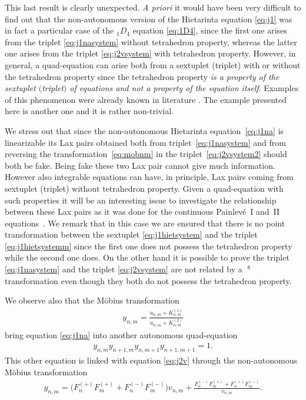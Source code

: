 \documentclass[pdftex]{sigma}
\numberwithin{equation}{section}
\DeclareMathOperator{\Mob}{M\ddot{o}b}
\newcommand{\Fp}[1]{F^{(+)}_{#1}}
\newcommand{\Fm}[1]{F^{(-)}_{#1}}
\newcommand{\Fppp}{\Fp{n}\Fp{m}}
\newcommand{\Fpmm}{\Fp{n}\Fm{m}}
\newcommand{\Fmpm}{\Fm{n}\Fp{m}}
\newcommand{\Fmmp}{\Fm{n}\Fm{m}}
\begin{document}
This last result is clearly unexpected. \emph{A priori} it would have been very dif\/f\/icult to f\/ind out that the non-autonomous
version of the Hietarinta equation \eqref{eq:j1} was in fact a particular
case of the $_{1}D_{4}$ equation \eqref{eq:1D4},
since the f\/irst one arises from the triplet \eqref{eq:j1nasystem}
without tetrahedron property,
whereas the latter one arises from the triplet \eqref{eq:j2vsystem}
with tetrahedron property.
However, in general, a quad-equation can arise both from a sextuplet (triplet) with
or without the tetrahedron property since the tetrahedron property
\emph{is a property of the sextuplet $($triplet$)$ of equations and not a property
of the equation itself}.
Examples of this phenomenon were already known in literature
\cite{ABS2009,Atkinson2008, HietarintaViallet2012}.
The example presented here is another one and it is rather non-trivial.

We stress out that since the non-autonomous Hietarinta equation~\eqref{eq:j1na}
is linearizable its Lax pairs obtained both
from triplet~\eqref{eq:j1nasystem} and from
reversing the transformation~\eqref{eq:mobnm} in the triplet~\eqref{eq:j2vsystem2} should both be fake.
Being fake these two Lax pair cannot give much information.
However also integrable equations can have, in principle,
Lax pairs coming from sextuplet (triplet) without tetrahedron property.
Given a quad-equation with such properties
it will be an interesting issue to investigate
the relationship between these Lax pairs as it was
done for the continuous Painlev\'e~I and~II equations~\cite{Joshietal2009}.
We remark that in this case we are ensured that there
is no point transformation between the sextuplet \eqref{eq:j1hietsystem}
and the triplet \eqref{eq:j1hietsystemm} since the f\/irst one does
not possess the tetrahedron property while the second one does.
On the other hand it is possible to prove the triplet
\eqref{eq:j1nasystem} and the triplet \eqref{eq:j2vsystem}
are not related by a $\Mob^{8}$ transformation even though
they both do not possess the tetrahedron property.


\begin{Remark}
 We observe also that the M\"obius transformation
 \begin{gather}
 y_{n,m} = \frac{u_{n,m}+K_{n,m}^{(1)}}{u_{n,m}+K_{n,m}^{(2)}} \label{eq:moby}
 \end{gather}
 bring equation \eqref{eq:j1na} into another autonomous quad-equation
 \begin{gather*}
 y_{n,m}y_{n+1,m}y_{n,m+1}y_{n+1,m+1}=1. %
 \end{gather*}
 This other equation is linked with equation \eqref{eq:j2v}
 through the non-autonomous M\"obius transformation~\cite{Hietarinta2005}
 \begin{gather*}
 y_{n, m} = \big( \Fppp+\Fmmp \big)v_{n, m}+\frac{\Fmpm+\Fpmm}{v_{n, m}}. %
 \end{gather*}
\end{Remark}
\end{document}
